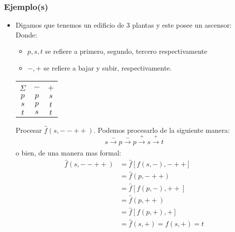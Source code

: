 \subsubsection{Ejemplo(s)}
\begin{itemize}
\item Digamos que tenemos un edificio de 3 plantas y este posee un ascensor: \\
Donde: 
\begin{itemize}
\item $p,s,t$ se refiere a primero, segundo, tercero respectivamente 
\item $-,+$ se refiere a bajar y subir, respectivamente.
\end{itemize}
\begin{center}
\begin{tabular}{|c|cc|}
    \hline
    \backslashbox{$k$}{\vspace{0.1pt}\\$\Sigma$} & $-$ & $+$ \\ \hline
                $p$             &   $p$   &  $s$\\ 
                $s$             &   $p$   &  $t$\\ 
                $t$             &   $s$   &  $t$ \\ \hline
\end{tabular} 
\end{center}
Procesar $\hat{f}(s,--++)$. Podemos procesarlo de la siguiente manera:
$$ s \xrightarrow[]{-} p \xrightarrow[]{-} p \xrightarrow[]{+} s \xrightarrow[]{+} t$$
o bien, de una manera mas formal:
\begin{align*}
\hat{f}(s,--++) & = \hat{f}[f(s,-),-++] \\
		    & = \hat{f}(p,-++) \\
		    & = \hat{f}[f(p,-),++] \\
		    & = \hat{f}(p,++) \\
		    & = \hat{f}[f(p,+),+] \\
		    & = \hat{f}(s,+) = f(s,+) = t
\end{align*}

\end{itemize}

